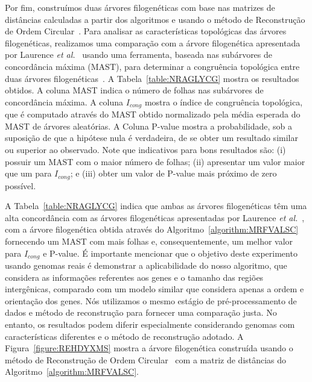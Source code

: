 Por fim, construímos duas árvores filogenéticas com base nas matrizes de distâncias calculadas a partir dos algoritmos e usando o método de Reconstrução de Ordem Circular~\cite{makarenkov1997tree}. Para analisar as características topológicas das árvores filogenéticas, realizamos uma comparação com a árvore filogenética apresentada por Laurence \textit{et al.}~\cite{garczarek2020cyanorak} usando uma ferramenta, baseada nas subárvores de concordância máxima (MAST), para determinar a congruência topológica entre duas árvores filogenéticas~\cite{de2007congruence}. A Tabela~\ref{table:NRAGLYCG} mostra os resultados obtidos. A coluna MAST indica o número de folhas nas subárvores de concordância máxima. A coluna $I_{cong}$ mostra o índice de congruência topológica, que é computado através do MAST obtido normalizado pela média esperada do MAST de árvores aleatórias. A Coluna P-value mostra a probabilidade, sob a suposição de que a hipótese nula é verdadeira, de se obter um resultado similar ou superior ao observado. Note que indicativos para bons resultados são: (i) possuir um MAST com o maior número de folhas; (ii) apresentar um valor maior que um para $I_{cong}$; e (iii) obter um valor de P-value mais próximo de zero possível.



A Tabela~\ref{table:NRAGLYCG} indica que ambas as árvores filogenéticas têm uma alta concordância com as árvores filogenéticas apresentadas por Laurence \textit{et al.}~\cite{garczarek2020cyanorak}, com a árvore filogenética obtida através do Algoritmo~\ref{algorithm:MRFVALSC} fornecendo um MAST com mais folhas e, consequentemente, um melhor valor para $I_{cong}$ e P-value. É importante mencionar que o objetivo deste experimento usando genomas reais é demonstrar a aplicabilidade do nosso algoritmo, que considera as informações referentes aos genes e o tamanho das regiões intergênicas, comparado com um modelo similar que considera apenas a ordem e orientação dos genes. Nós utilizamos o mesmo estágio de pré-processamento de dados e método de reconstrução para fornecer uma comparação justa. No entanto, os resultados podem diferir especialmente considerando genomas com características diferentes e o método de reconstrução adotado. A Figura~\ref{figure:REHDYXMS} mostra a árvore filogenética construída usando o método de Reconstrução de Ordem Circular~\cite{makarenkov1997tree} com a matriz de distâncias do Algoritmo~\ref{algorithm:MRFVALSC}.



